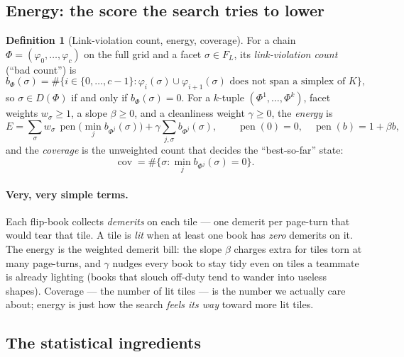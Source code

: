 \documentclass[11pt]{article}
\theoremstyle{definition}
\newtheorem{definition}{Definition}
\begin{document}
\subsection{Energy: the score the search tries to lower}

\begin{definition}[Link-violation count, energy, coverage]
\label{def:energy}
For a chain $\Phi = (\varphi_0, \dots, \varphi_c)$ on the full grid and a
facet $\sigma \in F_L$, its \emph{link-violation count} (``bad count'') is
\[
b_\Phi(\sigma) = \#\bigl\{ i \in \{0, \dots, c-1\} :
\varphi_i(\sigma) \cup \varphi_{i+1}(\sigma)
\text{ does not span a simplex of } K \bigr\},
\]
so $\sigma \in D(\Phi)$ if and only if $b_\Phi(\sigma) = 0$.
For a $k$-tuple $(\Phi^1, \dots, \Phi^k)$, facet weights $w_\sigma \geq 1$, a
slope $\beta \geq 0$, and a cleanliness weight $\gamma \geq 0$, the
\emph{energy} is
\[
E = \sum_{\sigma} w_\sigma\,
\operatorname{pen}\bigl(\textstyle\min_j b_{\Phi^j}(\sigma)\bigr)
+ \gamma \sum_{j,\sigma} b_{\Phi^j}(\sigma),
\qquad
\operatorname{pen}(0) = 0,\quad \operatorname{pen}(b) = 1 + \beta b,
\]
and the \emph{coverage} is the unweighted count that decides the
``best-so-far'' state:
\[
\operatorname{cov} = \#\bigl\{ \sigma : \textstyle\min_j b_{\Phi^j}(\sigma) = 0 \bigr\}.
\]
\end{definition}

\paragraph{Very, very simple terms.}
Each flip-book collects \emph{demerits} on each tile --- one demerit per
page-turn that would tear that tile. A tile is \emph{lit} when at least one
book has \emph{zero} demerits on it. The energy is the weighted demerit
bill: the slope $\beta$ charges extra for tiles torn at many page-turns, and
$\gamma$ nudges every book to stay tidy even on tiles a teammate is already
lighting (books that slouch off-duty tend to wander into useless shapes).
Coverage --- the number of lit tiles --- is the number we actually care
about; energy is just how the search \emph{feels its way} toward more lit
tiles.

\subsection{The statistical ingredients}
\end{document}
